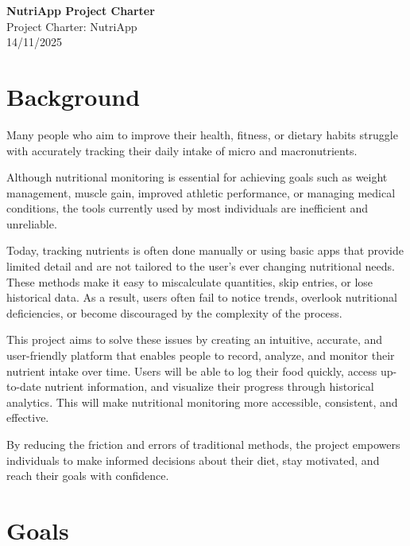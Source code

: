 \documentclass[11pt,a4paper]{article}
\begin{document}
    \begin{center}
        {\Large \textbf{NutriApp Project Charter}} \\
        \vspace{0.5cm}
        {Project Charter: NutriApp} \\
        14/11/2025
    \end{center}

    \section*{Background}

    Many people who aim to improve their health, fitness, or dietary habits struggle with accurately tracking their daily intake of micro and macronutrients.

    Although nutritional monitoring is essential for achieving goals such as weight management, muscle gain, improved athletic performance, or managing medical conditions, the tools currently used by most individuals are inefficient and unreliable.

    Today, tracking nutrients is often done manually or using basic apps that provide limited detail and are not tailored to the user's ever changing nutritional needs. These methods make it easy to miscalculate quantities, skip entries, or lose historical data. As a result, users often fail to notice trends, overlook nutritional deficiencies, or become discouraged by the complexity of the process.

    This project aims to solve these issues by creating an intuitive, accurate, and user-friendly platform that enables people to record, analyze, and monitor their nutrient intake over time. Users will be able to log their food quickly, access up-to-date nutrient information, and visualize their progress through historical analytics. This will make nutritional monitoring more accessible, consistent, and effective.

    By reducing the friction and errors of traditional methods, the project empowers individuals to make informed decisions about their diet, stay motivated, and reach their goals with confidence.

    \section*{Goals}
\end{document}
